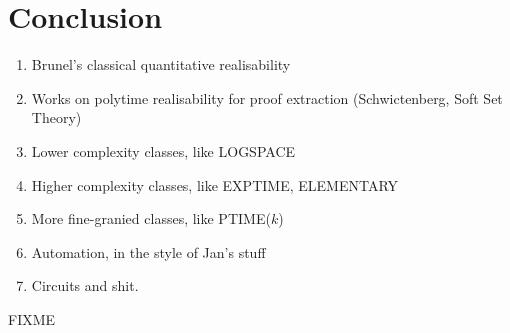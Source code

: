 \documentclass[acmsmall,review]{acmart}
\begin{document}
\section{Conclusion}
\label{sec:conclusion}

\begin{enumerate}
\item Brunel's classical quantitative realisability
\item Works on polytime realisability for proof extraction (Schwictenberg, Soft Set Theory)
\item Lower complexity classes, like LOGSPACE
\item Higher complexity classes, like EXPTIME, ELEMENTARY
\item More fine-granied classes, like PTIME($k$)
\item Automation, in the style of Jan's stuff
\item Circuits and shit.
\end{enumerate}


\begin{acks}
  FIXME
\end{acks}



\end{document}
